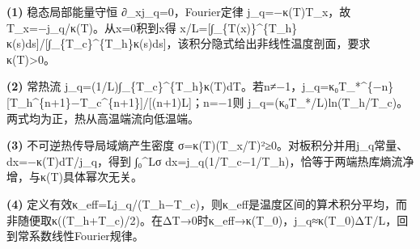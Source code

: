 \par\noindent\textbf{(1)} 稳态局部能量守恒 ∂\_xj\_q=0，Fourier定律 j\_q=−κ(T)T\_x，故 T\_x=−j\_q/κ(T)。从x=0积到x得 x/L=[∫\_\{T(x)\}\textasciicircum{}\{T\_h\}κ(s)ds]/[∫\_\{T\_c\}\textasciicircum{}\{T\_h\}κ(s)ds]，该积分隐式给出非线性温度剖面，要求κ(T)>0。
\par\noindent\textbf{(2)} 常热流 j\_q=(1/L)∫\_\{T\_c\}\textasciicircum{}\{T\_h\}κ(T)dT。若n≠−1，j\_q=κ₀T\_*\textasciicircum{}\{−n\}[T\_h\textasciicircum{}\{n+1\}−T\_c\textasciicircum{}\{n+1\}]/[(n+1)L]；n=−1则 j\_q=(κ₀T\_*/L)ln(T\_h/T\_c)。两式均为正，热从高温端流向低温端。
\par\noindent\textbf{(3)} 不可逆热传导局域熵产生密度 σ=κ(T)(T\_x/T)²≥0。对板积分并用j\_q常量、dx=−κ(T)dT/j\_q，得到 ∫₀\textasciicircum{}Lσ dx=j\_q(1/T\_c−1/T\_h)，恰等于两端热库熵流净增，与κ(T)具体幂次无关。
\par\noindent\textbf{(4)} 定义有效κ\_eff=Lj\_q/(T\_h−T\_c)，则κ\_eff是温度区间的算术积分平均，而非随便取κ((T\_h+T\_c)/2)。在ΔT→0时κ\_eff→κ(T\_0)，j\_q≈κ(T\_0)ΔT/L，回到常系数线性Fourier规律。
